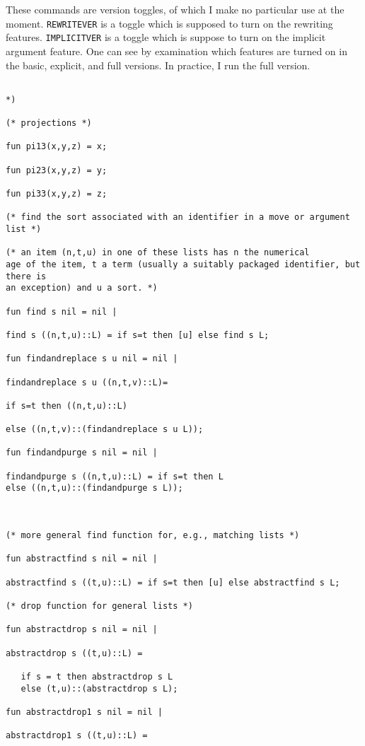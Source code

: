\documentclass{article}
\begin{document}
These commands are version toggles, of which I make no particular use at the moment.  {\tt REWRITEVER} is a toggle which is supposed to turn on the rewriting features.  {\tt IMPLICITVER} is a toggle which is suppose to turn on the implicit argument feature.  One can see by examination which 
features are turned on in the basic, explicit, and full versions.  In practice, I run the full version.

\begin{verbatim}

*)

(* projections *)

fun pi13(x,y,z) = x;

fun pi23(x,y,z) = y;

fun pi33(x,y,z) = z;

(* find the sort associated with an identifier in a move or argument list *)

(* an item (n,t,u) in one of these lists has n the numerical
age of the item, t a term (usually a suitably packaged identifier, but there is
an exception) and u a sort. *)

fun find s nil = nil |

find s ((n,t,u)::L) = if s=t then [u] else find s L;

fun findandreplace s u nil = nil |

findandreplace s u ((n,t,v)::L)=

if s=t then ((n,t,u)::L)

else ((n,t,v)::(findandreplace s u L));

fun findandpurge s nil = nil |

findandpurge s ((n,t,u)::L) = if s=t then L
else ((n,t,u)::(findandpurge s L));



(* more general find function for, e.g., matching lists *)

fun abstractfind s nil = nil |

abstractfind s ((t,u)::L) = if s=t then [u] else abstractfind s L;

(* drop function for general lists *)

fun abstractdrop s nil = nil |

abstractdrop s ((t,u)::L) = 

   if s = t then abstractdrop s L
   else (t,u)::(abstractdrop s L);

fun abstractdrop1 s nil = nil |

abstractdrop1 s ((t,u)::L) = 


\end{verbatim}
\end{document}
